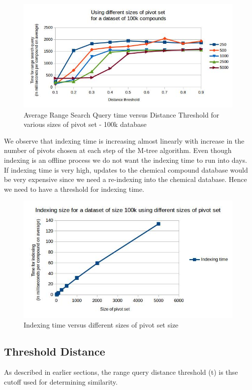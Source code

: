 \begin{figure}[ht!]	
\centering
\includegraphics[width=1 \columnwidth]{img/image4.jpg}
\caption{Average Range Search Query time versus Distance Threshold for various sizes of pivot set - 100k database}
\label{fig:5.5}
\end{figure}


We observe that indexing time is increasing almost linearly with increase in the number of pivots chosen at each step of the M-tree algorithm. Even though indexing is an offline process we do not want the indexing time to run into days. If indexing time is very high, updates to the chemical compound database would be very expensive since we need a re-indexing into the chemical database. Hence we need to have a threshold for indexing time.
\begin{figure}[ht!]	
\centering
\includegraphics[width=1 \columnwidth]{img/image7.jpg}
\caption{Indexing time versus different sizes of pivot set size}
\label{fig:5.6}
\end{figure}



\subsection{Threshold Distance}
As described in earlier sections, the range query distance threshold (t) is thse cutoff used for determining similarity.

